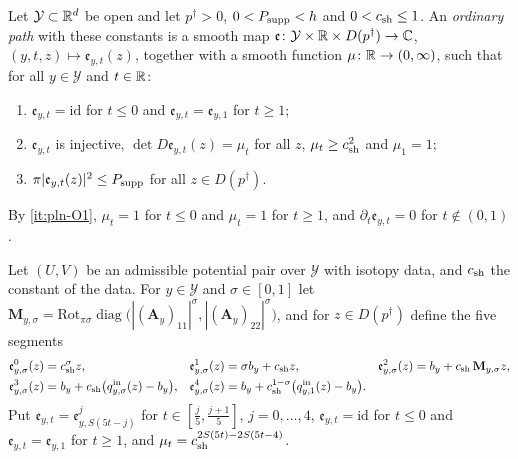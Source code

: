 \begin{definition}\label{def:pln-ordinary-path}
Let $\mathcal Y\subset\mathbb{R}^d$ be open and let $p^\dagger>0$, $0<P_{\rm supp}<h$ and $0<c_{\rm sh}\le1$. An
\emph{ordinary path} with these constants is a smooth map
$\mathfrak e\colon\mathcal Y\times\mathbb{R}\times D(p^\dagger)\to\mathbb{C}$, $(y,t,z)\mapsto\mathfrak e_{y,t}(z)$, together with a smooth function
$\mu\colon\mathbb{R}\to(0,\infty)$, such that for all $y\in\mathcal Y$ and $t\in\mathbb{R}$:
\begin{enumerate}[label=(O\arabic*)]
\item\label{it:pln-O1} $\mathfrak e_{y,t}=\mathrm{id}$ for $t\le0$ and $\mathfrak e_{y,t}=\mathfrak e_{y,1}$ for $t\ge1$;
\item\label{it:pln-O2} $\mathfrak e_{y,t}$ is injective, $\det D\mathfrak e_{y,t}(z)=\mu_t$ for all $z$, $\mu_t\ge c_{\rm sh}^2$ and $\mu_1=1$;
\item\label{it:pln-O3} $\pi|\mathfrak e_{y,t}(z)|^2\le P_{\rm supp}$ for all $z\in D(p^\dagger)$.
\end{enumerate}
\end{definition}

By \ref{it:pln-O1}, $\mu_t=1$ for $t\le0$ and $\mu_t=1$ for $t\ge1$, and $\partial_t\mathfrak e_{y,t}=0$ for $t\notin(0,1)$.

\begin{construction}\label{cons:pln-five-segment}
Let $(U,V)$ be an admissible potential pair over $\mathcal Y$ with isotopy data, and $c_{\rm sh}$ the constant of the data. For
$y\in\mathcal Y$ and $\sigma\in[0,1]$ let
$\mathbf M_{y,\sigma}=\mathrm{Rot}_{\pi\sigma}\operatorname{diag}\bigl(|(\mathbf A_y)_{11}|^\sigma,|(\mathbf A_y)_{22}|^\sigma\bigr)$, and for
$z\in D(p^\dagger)$ define the five segments
\begin{align*}
 \mathfrak e^0_{y,\sigma}(z)&=c_{\rm sh}^\sigma z, &
 \mathfrak e^1_{y,\sigma}(z)&=\sigma b_y+c_{\rm sh}z, &
 \mathfrak e^2_{y,\sigma}(z)&=b_y+c_{\rm sh}\,\mathbf M_{y,\sigma}z,\\
 \mathfrak e^3_{y,\sigma}(z)&=b_y+c_{\rm sh}\bigl(q^{\rm in}_{y,\sigma}(z)-b_y\bigr), &
 \mathfrak e^4_{y,\sigma}(z)&=b_y+c_{\rm sh}^{1-\sigma}\bigl(q^{\rm in}_{y,1}(z)-b_y\bigr).
\end{align*}
Put $\mathfrak e_{y,t}=\mathfrak e^j_{y,S(5t-j)}$ for $t\in[\frac j5,\frac{j+1}5]$, $j=0,\dots,4$, $\mathfrak e_{y,t}=\mathrm{id}$ for $t\le0$
and $\mathfrak e_{y,t}=\mathfrak e_{y,1}$ for $t\ge1$, and $\mu_t=c_{\rm sh}^{2S(5t)-2S(5t-4)}$.
\end{construction}

